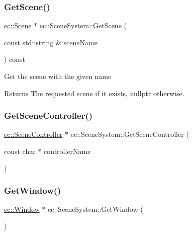 \mbox{\label{classec_1_1_scene_system_a94cdf226415c276098032857b36ecc95}} 
\subsubsection{\texorpdfstring{Get\+Scene()}{GetScene()}}
{\footnotesize\ttfamily \mbox{\hyperlink{classec_1_1_scene}{ec\+::\+Scene}} $\ast$ ec\+::\+Scene\+System\+::\+Get\+Scene (\begin{DoxyParamCaption}\item[{const std\+::string \&}]{scene\+Name }\end{DoxyParamCaption}) const}

Get the scene with the given name \begin{DoxyReturn}{Returns}
The requested scene if it exists, nullptr otherwise. 
\end{DoxyReturn}
\mbox{\label{classec_1_1_scene_system_a18f7a94cb7336f6a7ded7501ece69326}} 
\subsubsection{\texorpdfstring{Get\+Scene\+Controller()}{GetSceneController()}}
{\footnotesize\ttfamily \mbox{\hyperlink{classec_1_1_scene_controller}{ec\+::\+Scene\+Controller}} $\ast$ ec\+::\+Scene\+System\+::\+Get\+Scene\+Controller (\begin{DoxyParamCaption}\item[{const char $\ast$}]{controller\+Name }\end{DoxyParamCaption})}

\mbox{\label{classec_1_1_scene_system_a590db7786f2ec3c7951f06c5d5d2e664}} 
\subsubsection{\texorpdfstring{Get\+Window()}{GetWindow()}}
{\footnotesize\ttfamily \mbox{\hyperlink{classec_1_1_window}{ec\+::\+Window}} $\ast$ ec\+::\+Scene\+System\+::\+Get\+Window (\begin{DoxyParamCaption}{ }\end{DoxyParamCaption})}

